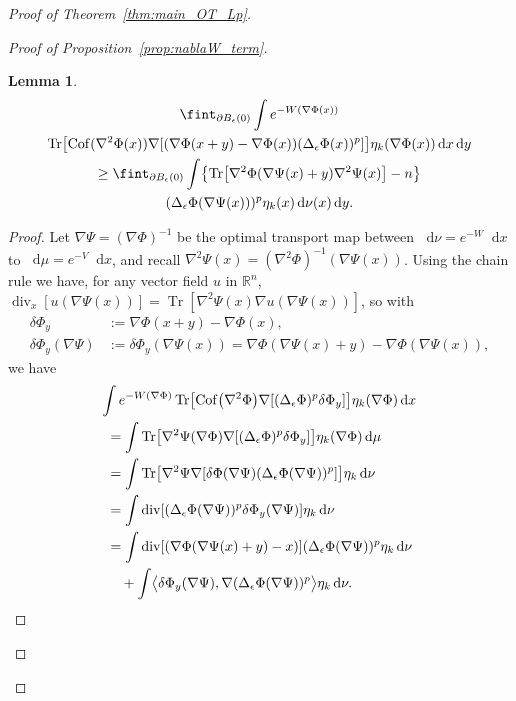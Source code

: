 \documentclass[10pt]{amsart}
\newtheorem{lemm}[theo]{Lemma}\newtheorem{prop}[theo]{Proposition}\newtheorem{coro}[theo]{Corollary}\newtheorem{conj}[theo]{Conjecture}
\theoremstyle{definition}\newtheorem{defi}[theo]{Definition}\newtheorem{rema}[theo]{Remark}\newtheorem{exam}[theo]{Example}\newtheorem{exem}[theo]{Example}\newtheorem{nota}[theo]{Notation}
\newcommand{\R}{\mathbb R}
\DeclareMathOperator{\Tr}{Tr}
\DeclareMathOperator{\Cof}{Cof}
\DeclareMathOperator{\Div}{div}
\newcommand{\V}{V}
\newcommand{\W}{W}
\newcommand{\dd}{n}
\newcommand{\source}{\mu}
\newcommand{\target}{\nu}
\newcommand*\diff{\mathop{}\!\mathrm{d}}
\newcommand{\OT}{\Phi}
\newcommand{\avgint}{\fint}
\newcommand{\findiff}{\delta\OT}
\let\originalleft\left
\let\originalright\right
\renewcommand{\left}{\mathopen{}\mathclose\bgroup\originalleft}
\renewcommand{\right}{\aftergroup\egroup\originalright}
\begin{document}
\begin{proof}[Proof of Theorem~\ref{thm:main_OT_Lp}]
\begin{proof}[Proof of Proposition~\ref{prop:nablaW_term}]
\begin{lemm}\label{lem:1term}
\begin{multline}\label{eq:1term}
\avgint_{\partial B_{\epsilon}(0)}\int e^{-\W(\nabla\OT(x))}\\ \Tr\bigl[\Cof(\nabla^2\OT(x))\nabla\left[(\nabla \OT(x+y)
-\nabla \OT(x))(\Delta_{\epsilon}\OT(x))^p\right]\bigr]\eta_k(\nabla\OT(x))\diff x\diff y\\
\ge \avgint_{\partial B_{\epsilon}(0)}\int\left \{\Tr\left[\nabla^2\OT(\nabla\Psi(x)+y)\nabla^2\Psi(x)\right]-\dd\right\}\\(\Delta_{\epsilon}\OT(\nabla\Psi(x)))^p \eta_k(x)\diff \target(x)\diff y.
\end{multline}
\end{lemm}
\begin{proof}
Let $\nabla\Psi=(\nabla \OT)^{-1}$ be the optimal transport map between $\diff \target=e^{-\W}\diff x$ to $\diff \source=e^{-\V}\diff x$, and recall $\nabla^2\Psi(x)=(\nabla^2\OT)^{-1}(\nabla\Psi(x))$. Using the chain rule we have, for any vector field $u$ in $\R^{\dd}$, $\Div_x[u(\nabla \Psi(x))]=\Tr[\nabla^2 \Psi(x)\nabla u(\nabla \Psi(x))]$, so with
\begin{align*}
\findiff_y &:=\nabla \OT(x+y)-\nabla \OT(x), \\
\findiff_y(\nabla\Psi) &:=\findiff_y(\nabla\Psi(x))=\nabla \OT(\nabla\Psi(x)+y)-\nabla \OT(\nabla\Psi(x)),
\end{align*}
we have
\begin{multline*}
\int e^{-\W(\nabla\OT)} \Tr\left[\Cof\bigl(\nabla^2\OT\bigr)\nabla[(\Delta_{\epsilon}\OT)^p\findiff_y]\right]\eta_k(\nabla\OT)\diff x\\
\begin{aligned}
&=\int \Tr\left[\nabla^2\Psi(\nabla\OT)\nabla[(\Delta_{\epsilon}\OT)^p\findiff_y]\right]\eta_k(\nabla\OT)\diff \source\\
&=\int \Tr\left[\nabla^2\Psi\nabla[\findiff(\nabla\Psi)(\Delta_{\epsilon}\OT(\nabla\Psi))^p]\right]\eta_k\diff \target\\
&=\int \Div[(\Delta_{\epsilon}\OT(\nabla\Psi))^p \findiff_y(\nabla\Psi)]\eta_k\diff \target\\
&=\int \Div[\left(\nabla \OT(\nabla\Psi(x)+y)-x\right)](\Delta_{\epsilon}\OT(\nabla\Psi))^p \eta_k\diff \target\\
&\quad+\int \bigl\langle\findiff_y(\nabla\Psi),\nabla(\Delta_{\epsilon}\OT(\nabla\Psi))^p \bigr\rangle\eta_k\diff \target.
\end{aligned}
\end{multline*}

\end{proof}
\end{proof}
\end{proof}
\end{document}
